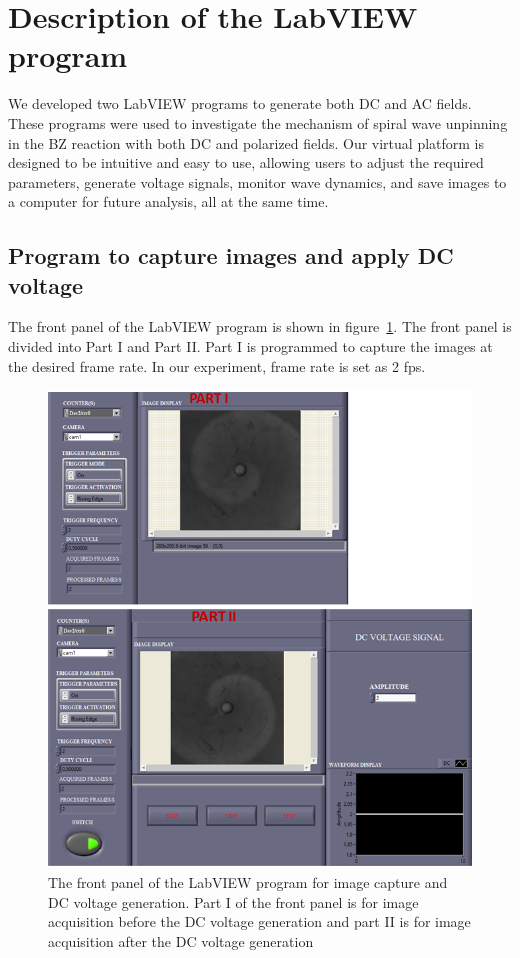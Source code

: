 \documentclass[journal=jacsat,manuscript=article]{achemso}
\begin{document}
\section{Description of the LabVIEW program}

We developed two LabVIEW programs to generate both DC and AC
fields. These programs were used to investigate the mechanism of
spiral wave unpinning in the BZ reaction with both DC and polarized
fields.  Our virtual platform is designed to be
intuitive and easy to use, allowing users to adjust the required
parameters, generate voltage signals, monitor wave dynamics, and save
images to a computer for future analysis, all at the same time.
\subsection{Program to capture images and apply DC voltage}
The front panel of the LabVIEW program is shown in  figure~\ref{fig:ex3}. The front panel is divided into Part I and Part II. Part I is programmed to capture the images at the desired frame rate. In our experiment, frame rate is set as 2 fps. 
\begin{figure}[H]
    \centering
    \includegraphics[width=\linewidth]{Dc_frntpnl.png}
    \caption{The front panel of the LabVIEW program for image capture and DC voltage generation. Part I of the front panel is for image acquisition before the DC voltage generation and part II is for image acquisition after the DC voltage generation}
    \label{fig:ex3}
\end{figure}
\end{document}
